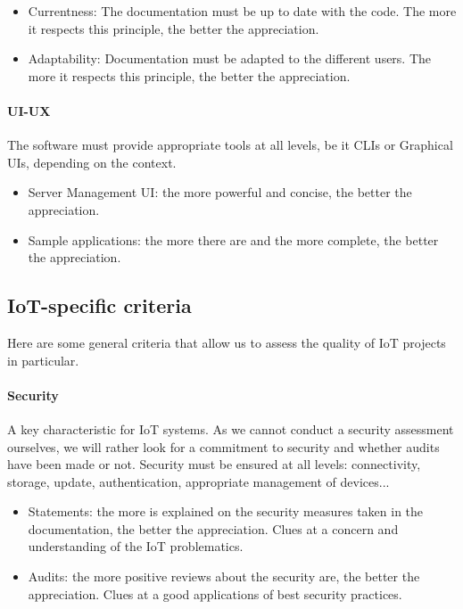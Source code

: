 \documentclass{article}
\begin{document}
\begin{itemize}
\item Currentness: The documentation must be up to date with the code. The more it respects this principle, the better the appreciation.
\item Adaptability: Documentation must be adapted to the different users. The more it respects this principle, the better the appreciation.
\end{itemize}

\paragraph{UI-UX} The software must provide appropriate tools at all levels, be it CLIs or Graphical UIs, depending on the context.

\begin{itemize}
\item Server Management UI: the more powerful and concise, the better the appreciation.
\item Sample applications: the more there are and the more complete, the better the appreciation.
\end{itemize}

\subsection{IoT-specific criteria}

Here are some general criteria that allow us to assess the quality of IoT projects in particular.

\paragraph{Security} A key characteristic for IoT systems. As we cannot conduct a security assessment ourselves, we will rather look for a commitment to security and whether audits have been made or not. Security must be ensured at all levels: connectivity, storage, update, authentication, appropriate management of devices...

\begin{itemize}
\item Statements: the more is explained on the security measures taken in the documentation, the better the appreciation. Clues at a concern and understanding of the IoT problematics.
\item Audits: the more positive reviews about the security are, the better the appreciation. Clues at a good applications of best security practices.
\end{itemize}
\end{document}
